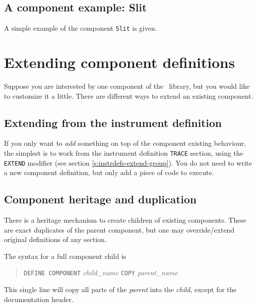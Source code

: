 \subsection{A component example: Slit}
\label{s:slit}
A simple example of the component \texttt{Slit} is given.



\section{Extending component definitions}
\label{s:compdefs-extend}

Suppose you are interested by one component of the \MCS\ library, but you would
like to customize it a little. There are different ways to extend an existing
component.

\subsection{Extending from the instrument definition}

If you only want to \emph{add} something on top of the component existing behaviour, the simplest is to work from the instrument definition \texttt{TRACE} section, using the \texttt{EXTEND} modifier (see section \ref{s:instrdefs-extend-group}). You do not need to write a new component definition, but only add a piece of code to execute.

\subsection{Component heritage and duplication}

There is a heritage mechanism to create children of existing components. These
are exact duplicates of the parent component, but one may override/extend
original definitions of any section.

The syntax for a full component child is
\begin{quote}
  \texttt{DEFINE COMPONENT} {\it child\_name} \texttt{COPY} {\it parent\_name}
\end{quote}
This single line will copy all parts of the {\it parent} into the {\it child}, except for the documentation header.

